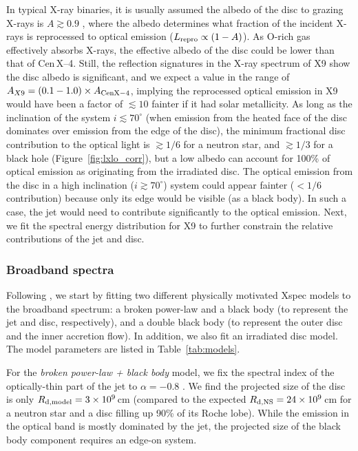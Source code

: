 \documentclass[a4paper,fleqn,usenatbib]{mnras}
\begin{document}
In typical X-ray binaries, it is usually assumed the albedo of the disc to grazing X-rays is $A \gtrsim 0.9$ \citep{1996A&A...314..484D}, where the albedo determines what fraction of the incident X-rays is reprocessed to optical emission ($L_{\rm repro} \propto (1 - A)$). As O-rich gas effectively absorbs X-rays, the effective albedo of the disc could be lower than that of Cen\,X--4. Still, the reflection signatures in the X-ray spectrum of X9 \citep{2017MNRAS.467.2199B} show the disc albedo is significant, and we expect a value in the range of $A_{X9} = (0.1-1.0) \times A_{\rm Cen X-4}$, implying the reprocessed optical emission in X9 would have been a factor of $\lesssim 10$ fainter if it had solar metallicity. As long as the inclination of the system $i \lesssim 70^\circ$ (when emission from the heated face of the disc dominates over emission from the edge of the disc), the minimum fractional disc contribution to the optical light is $\gtrsim 1/6$ for a neutron star, and $\gtrsim 1/3$ for a black hole (Figure~\ref{fig:lxlo_corr}), but a low albedo can account for 100\% of optical emission as originating from the irradiated disc. The optical emission from the disc in a high inclination ($i \gtrsim 70^\circ$) system could appear fainter ($<1/6$ contribution) because only its edge would be visible (as a black body). In such a case, the jet would need to contribute significantly to the optical emission. Next, we fit the spectral energy distribution for X9 to further constrain the relative contributions of the jet and disc.

\subsubsection{Broadband spectra}
\label{sec:mods}

Following \citet{2007ApJ...670..600G}, we start by fitting two different physically motivated {\sc Xspec} models to the broadband spectrum: a broken power-law and a black body (to represent the jet and disc, respectively), and a double black body (to represent the outer disc and the inner accretion flow). In addition, we also fit an irradiated disc model. The model parameters are listed in Table~\ref{tab:models}. 

For the {\it broken power-law + black body} model, we fix the spectral index of the optically-thin part of the jet to $\alpha = -0.8$ \citep{2007ApJ...670..600G}. We find the projected size of the disc is only $R_{\rm d, model} = 3 \times 10^9$\,cm (compared to the expected $R_{\rm d, NS} = 24 \times 10^9$\,cm for a neutron star and a disc filling up 90\% of its Roche lobe). While the emission in the optical band is mostly dominated by the jet, the projected size of the black body component requires an edge-on system.
\end{document}
